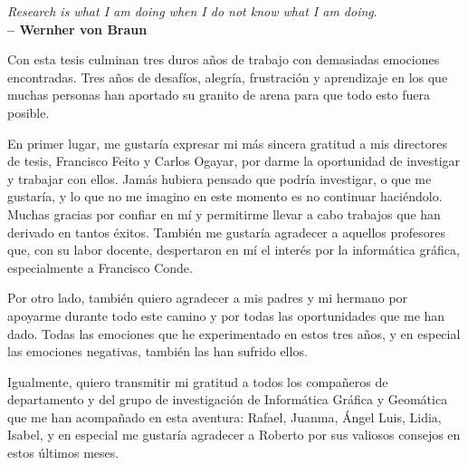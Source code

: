 \newpage
\begin{flushright}
	\textit{Research is what I am doing when I do not know what I am doing}.\\
    \textbf{-- Wernher von Braun}
\end{flushright}


\normalsize
\libertineNormal



\noindent Con esta tesis culminan tres duros años de trabajo con demasiadas emociones encontradas. Tres años de desafíos, alegría, frustración y aprendizaje en los que muchas personas han aportado su granito de arena para que todo esto fuera posible. 

\noindent En primer lugar, me gustaría expresar mi más sincera gratitud a mis directores de tesis, Francisco Feito y Carlos Ogayar, por darme la oportunidad de investigar y trabajar con ellos. Jamás hubiera pensado que podría investigar, o que me gustaría, y lo que no me imagino en este momento es no continuar haciéndolo. Muchas gracias por confiar en mí y permitirme llevar a cabo trabajos que han derivado en tantos éxitos. También me gustaría agradecer a aquellos profesores que, con su labor docente, despertaron en mí el interés por la informática gráfica, especialmente a Francisco Conde. 

\noindent Por otro lado, también quiero agradecer a mis padres y mi hermano por apoyarme durante todo este camino y por todas las oportunidades que me han dado. Todas las emociones que he experimentado en estos tres años, y en especial las emociones negativas, también las han sufrido ellos.

\noindent Igualmente, quiero transmitir mi gratitud a todos los compañeros de departamento y del grupo de investigación de Informática Gráfica y Geomática que me han acompañado en esta aventura: Rafael, Juanma, Ángel Luis, Lidia, Isabel, y en especial me gustaría agradecer a Roberto por sus valiosos consejos en estos últimos meses. 

